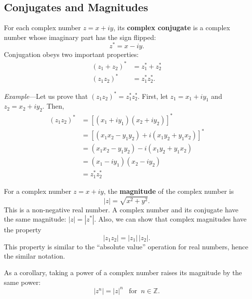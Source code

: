 \documentclass[10pt,a4paper]{article}
\begin{document}
\subsection{Conjugates and Magnitudes}
\label{conjugates-and-magnitudes}

For each complex number $z = x + iy$, its \textbf{complex conjugate}
is a complex number whose imaginary part has the sign flipped:
\begin{equation}
  z^* = x - i y.
\end{equation}
Conjugation obeys two important properties:
\begin{align}
  (z_1 + z_2)^* &= z_1^* + z_2^* \\
  (z_1 z_2)^* &= z_1^* z_2^*.
\end{align}

\begin{framed}\noindent
  \textit{Example}---Let us prove that $(z_1 z_2)^* = z_1^*
  z_2^*$. First, let $z_1 = x_1 + i y_1$ and $z_2 = x_2 + i y_2$.
  Then,
  \begin{align}
    (z_1 z_2)^* &= \left[(x_1+iy_1)(x_2+iy_2)\right]^* \\
    &= \left[\left(x_1 x_2 - y_1 y_2\right)
      + i\left(x_1y_2+y_1x_2\right)\right]^* \\
    &= \left(x_1 x_2 - y_1 y_2\right) - i\left(x_1y_2+y_1x_2\right) \\
    &= \left(x_1 - i y_1\right)\left(x_2 - i y_2\right) \\
    &= z_1^* z_2^*
  \end{align}
\end{framed}

For a complex number $z = x + i y$, the \textbf{magnitude} of the
complex number is
\begin{equation}
|z| = \sqrt{x^2 + y^2}.
\end{equation}
This is a non-negative real number. A complex number and its conjugate
have the same magnitude: $|z| = |z^*|$. Also, we can show that complex
magnitudes have the property
\begin{equation}
  |z_1 z_2| = |z_1| \, |z_2|.
\end{equation}
This property is similar to the ``absolute value'' operation for real
numbers, hence the similar notation.

As a corollary, taking a power of a complex number raises its
magnitude by the same power:
\begin{equation}
|z^n| = |z|^n \;\;\;\textrm{for}\;\;n \in \mathbb{Z}.
\end{equation}
\end{document}
